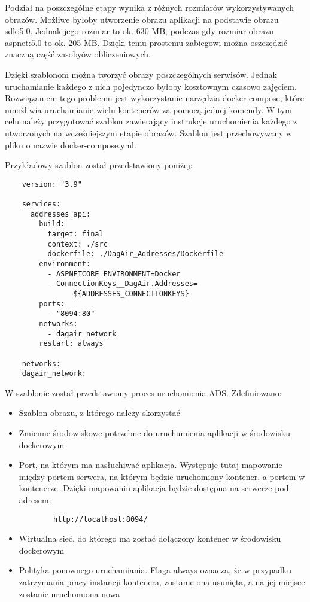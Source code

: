Podział na poszczególne etapy wynika z różnych rozmiarów wykorzystywanych obrazów. Możliwe byłoby
utworzenie obrazu aplikacji na podstawie obrazu sdk:5.0. Jednak jego rozmiar to ok. 630 MB, podczas
gdy rozmiar obrazu aspnet:5.0 to ok. 205 MB. Dzięki temu prostemu zabiegowi można oszczędzić 
znaczną część zasobyów obliczeniowych. 

Dzięki szablonom można tworzyć obrazy poszczególnych serwisów. Jednak uruchamianie każdego z nich
pojedynczo byłoby kosztownym czasowo zajęciem. Rozwiązaniem tego problemu jest wykorzystanie narzędzia
docker-compose, które umożliwia uruchamianie wielu kontenerów za pomocą jednej komendy. W tym celu
należy przygotować szablon zawierający instrukcje uruchomienia każdego z utworzonych na wcześniejszym
etapie obrazów. Szablon jest przechowywany w pliku o nazwie docker-compose.yml.

Przykładowy szablon został przedstawiony poniżej:

\begin{lstlisting}
    version: "3.9"

    services:
      addresses_api:
        build:
          target: final
          context: ./src
          dockerfile: ./DagAir_Addresses/Dockerfile
        environment:
          - ASPNETCORE_ENVIRONMENT=Docker
          - ConnectionKeys__DagAir.Addresses=
                ${ADDRESSES_CONNECTIONKEYS}
        ports:
          - "8094:80"
        networks:
          - dagair_network
        restart: always

    networks:
    dagair_network:
\end{lstlisting}

W szablonie został przedstawiony proces uruchomienia ADS. Zdefiniowano:

\begin{itemize}
    \item Szablon obrazu, z którego należy skorzystać
    \item Zmienne środowiskowe potrzebne do uruchumienia aplikacji w środowisku dockerowym
    \item Port, na którym ma nasłuchiwać aplikacja. Występuje tutaj mapowanie między portem 
    serwera, na którym będzie uruchomiony kontener, a portem w kontenerze. Dzięki mapowaniu
    aplikacja będzie dostępna na serwerze pod adresem:

    \begin{lstlisting}
        http://localhost:8094/
    \end{lstlisting}
    \item Wirtualna sieć, do którego ma zostać dołączony kontener w środowisku dockerowym
    \item Polityka ponownego uruchamiania. Flaga always oznacza, że w przypadku zatrzymania pracy
    instancji kontenera, zostanie ona usunięta, a na jej miejsce zostanie uruchomiona nowa
\end{itemize}


